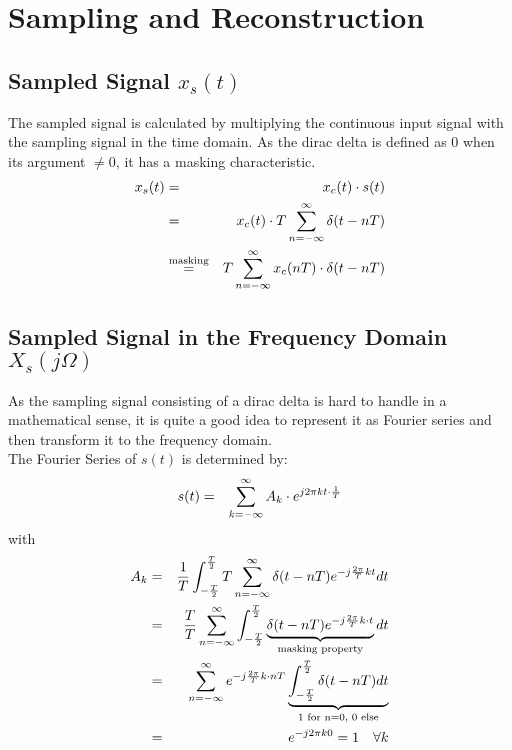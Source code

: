 \section{Sampling and Reconstruction} 

\subsection{Sampled Signal $x_s(t)$}

The sampled signal is calculated by multiplying the continuous input signal with the sampling signal in the time domain. As the dirac delta is defined as 0 when its argument $\neq 0$, it has a masking characteristic.
\begin{eqnarray*}
x_s(t) & = & x_c(t) \cdot s(t) \\
       & = & x_c(t) \cdot T \sum_{n=-\infty}^{\infty} \delta (t-nT) \\
       & \overset{\text{masking}}{=}  & T \sum_{n=-\infty}^{\infty} x_c(nT) \cdot \delta (t-nT)
\end{eqnarray*}


\subsection{Sampled Signal in the Frequency Domain $X_s(j\Omega)$}

As the sampling signal consisting of a dirac delta is hard to handle in a mathematical sense, it is quite a good idea to represent it as Fourier series and then transform it to the frequency domain.\\
The Fourier Series of $s(t)$ is determined by:
\begin{eqnarray*}
s(t) & = & \sum_{k=-\infty}^{\infty} A_k \cdot e^{j2\pi k t \cdot \frac{1}{T}}
\end{eqnarray*}
with
\begin{eqnarray*}
A_k & = & \frac{1}{T} \int_{-\frac{T}{2}}^{\frac{T}{2}} T \sum_{n=-\infty}^{\infty} \delta (t-nT) e^{-j \frac{2\pi}{T}kt}  dt \\
& = & \frac{T}{T}  \sum_{n=-\infty}^{\infty} \int_{-\frac{T}{2}}^{\frac{T}{2}} \underbrace{\delta (t-nT) e^{-j \frac{2\pi}{T}k\cdot t}}_{\text{masking property}} dt \\
& = & \sum_{n=-\infty}^{\infty}  e^{-j \frac{2\pi}{T}k\cdot nT} \underbrace{\int_{-\frac{T}{2}}^{\frac{T}{2}}  \delta (t-nT) dt}_{\text{1 for n=0, 0 else}} \\
& = & e^{-j 2 \pi k 0 } = 1 \quad \forall k
\end{eqnarray*}

